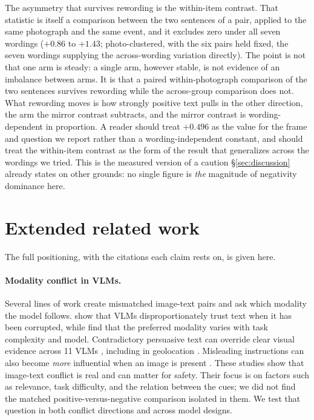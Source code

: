 \documentclass{article}
\begin{document}
The asymmetry that survives rewording is the within-item contrast. That statistic is itself a comparison between the two sentences of a pair, applied to the same photograph and the same event, and it excludes zero under all seven wordings ($+0.86$ to $+1.43$; photo-clustered, with the six pairs held fixed, the seven wordings supplying the across-wording variation directly). The point is not that one arm is steady: a single arm, however stable, is not evidence of an imbalance between arms. It is that a paired within-photograph comparison of the two sentences survives rewording while the across-group comparison does not. What rewording moves is how strongly positive text pulls in the other direction, the arm the mirror contrast subtracts, and the mirror contrast is wording-dependent in proportion. A reader should treat $+0.496$ as the value for the frame and question we report rather than a wording-independent constant, and should treat the within-item contrast as the form of the result that generalizes across the wordings we tried. This is the measured version of a caution \S\ref{sec:discussion} already states on other grounds: no single figure is \emph{the} magnitude of negativity dominance here.


\fi

\section{Extended related work}
\label{app:related}

The full positioning, with the citations each claim rests on, is given here.

\paragraph{Modality conflict in VLMs.}
Several lines of work create mismatched image-text pairs and ask which modality the model follows. \citet{deng2025blindfaith} show that VLMs disproportionately trust text when it has been corrupted, while \citet{mixedsignals2025} find that the preferred modality varies with task complexity and model. Contradictory persuasive text can override clear visual evidence across 11 VLMs \citep{contextvqa2026}, including in geolocation \citep{signpost2026}. Misleading instructions can also become \emph{more} influential when an image is present \citep{camel2025}. These studies show that image-text conflict is real and can matter for safety. Their focus is on factors such as relevance, task difficulty, and the relation between the cues; we did not find the matched positive-versus-negative comparison isolated in them. We test that question in both conflict directions and across model designs.
\end{document}
